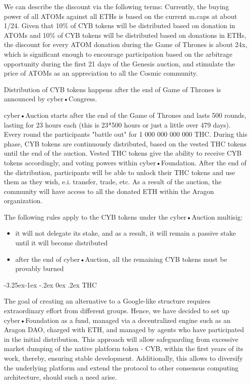 \documentclass[8pt,oneside]{amsart}
\makeatletter
\renewcommand\subsection{\@startsection{subsection}{2}{\z@}%
                                     {-3.25ex\@plus -1ex \@minus -.2ex}%
                                     {0ex \@plus .2ex}%
                                     {\play\Large}}%
\newcommand{\titleSection}[1]{\subsection{#1}}
\makeatother
\begin{document}
\begin{Abstract}
We can describe the discount via the following terms: Currently, the buying power of all ATOMs against all ETHs is based on the current m.caps at about 1/24. Given that 10\% of CYB tokens will be distributed based on donation in ATOMs and 10\% of CYB tokens will be distributed based on donations in ETHs, the discount for every ATOM donation during the Game of Thrones is about 24x, which is significant enough to encourage participation based on the arbitrage opportunity during the first 21 days of the Genesis auction, and stimulate the price of ATOMs as an appreciation to all the Cosmic community.

Distribution of CYB tokens happens after the end of Game of Thrones is announced by cyber•Congress.

cyber•Auction starts after the end of the Game of Thrones and lasts 500 rounds, lasting for 23 hours each (this is 23*500 hours or just a little over 479 days). Every round the participants "battle out" for 1 000 000 000 000 THC. During this phase, CYB tokens are continuously distributed, based on the vested THC tokens until the end of the auction. Vested THC tokens give the ability to receive CYB tokens accordingly, and voting powers within cyber•Foundation. After the end of the distribution, participants will be able to unlock their THC tokens and use them as they wish, e.i. transfer, trade, etc. As a result of the auction, the community will have access to all the donated ETH within the Aragon organization.

The following rules apply to the CYB tokens under the cyber•Auction multisig:

\begin{itemize}
\item it will not delegate its stake, and as a result, it will remain a passive stake until it will become distributed
\item after the end of cyber•Auction, all the remaining CYB tokens must be provably burned
\end{itemize}

\titleSection{THC}\label{THC}

The goal of creating an alternative to a Google-like structure requires extraordinary effort from different groups. Hence, we have decided to set up cyber•Foundation as a fund, managed via a decentralized engine such as an Aragon DAO, charged with ETH, and managed by agents who have participated in the initial distribution. This approach will allow safeguarding from excessive market dumping of the native platform token - CYB, within the first years of its work, thereby, ensuring stable development. Additionally, this allows to diversify the underlying platform and extend the protocol to other consensus computing architecture, should such a need arise.


\end{Abstract}
\end{document}
